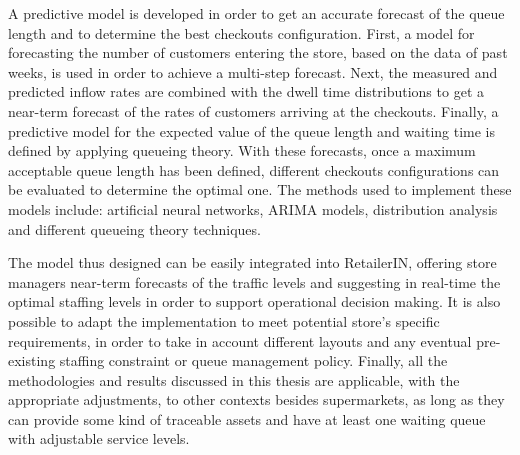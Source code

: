 A predictive model is developed in order to get an accurate forecast of the queue length and to determine the best checkouts configuration. First, a model for forecasting the number of customers entering the store, based on the data of past weeks, is used in order to achieve a multi-step forecast. Next, the measured and predicted inflow rates are combined with the dwell time distributions to get a near-term forecast of the rates of customers arriving at the checkouts. Finally, a predictive model for the expected value of the queue length and waiting time is defined by applying queueing theory. With these forecasts, once a maximum acceptable queue length has been defined, different checkouts configurations can be evaluated to determine the optimal one. The methods used to implement these models include: artificial neural networks, ARIMA models, distribution analysis and different queueing theory techniques.

The model thus designed can be easily integrated into RetailerIN, offering store managers near-term forecasts of the traffic levels and suggesting in real-time the optimal staffing levels in order to support operational decision making. It is also possible to adapt the implementation to meet potential store’s specific requirements, in order to take in account different layouts and any eventual pre-existing staffing constraint or queue management policy. Finally, all the methodologies and results discussed in this thesis are applicable, with the appropriate adjustments, to other contexts besides supermarkets, as long as they can provide some kind of traceable assets and have at least one waiting queue with adjustable service levels.

\clearpage